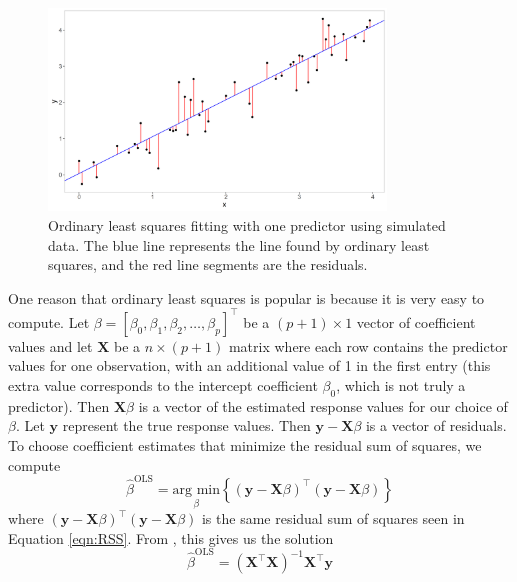 \documentclass{article}
\newcommand{\argmin}[2]{\underset{#1}{\text{arg min}}\left\{#2\right\}}
\begin{document}
\begin{figure}[!h]
	\centering
	\includegraphics[width = 0.8\textwidth]{images/ols.png}
	\captionsetup{width = 0.8\textwidth}
	\caption{Ordinary least squares fitting with one predictor using simulated data. The blue line represents the line found by ordinary least squares, and the red line segments are the residuals.}
	\label{fig:ols}
\end{figure}

One reason that ordinary least squares is popular is because it is very easy to compute. Let $\beta = [\beta_0, \beta_1, \beta_2, \dotsc, \beta_p]^\top$ be a $(p + 1) \times 1$ vector of coefficient values and let $\mathbf{X}$ be a $n\times (p + 1)$ matrix where each row contains the predictor values for one observation, with an additional value of 1 in the first entry (this extra value corresponds to the intercept coefficient $\beta_0$, which is not truly a predictor). Then $\mathbf{X}\beta$ is a vector of the estimated response values for our choice of $\beta$. Let $\mathbf{y}$ represent the true response values. Then $\mathbf{y} - \mathbf{X}\beta$ is a vector of residuals. To choose coefficient estimates that minimize the residual sum of squares, we compute
\begin{equation}
	\hat{\beta}^{\text{OLS}} = \argmin{\beta}{(\mathbf{y} - \mathbf{X}\beta)^\top (\mathbf{y} - \mathbf{X}\beta)}
\end{equation}
where $(\mathbf{y} - \mathbf{X}\beta)^\top (\mathbf{y} - \mathbf{X}\beta)$ is the same residual sum of squares seen in Equation \ref{eqn:RSS}. From \cite{friedman2001elements}, this gives us the solution
\begin{equation}\label{eqn:ols-solution}
	\hat{\beta}^{\text{OLS}} = (\mathbf{X}^\top \mathbf{X})^{-1} \mathbf{X}^\top \mathbf{y}
\end{equation}
\end{document}
